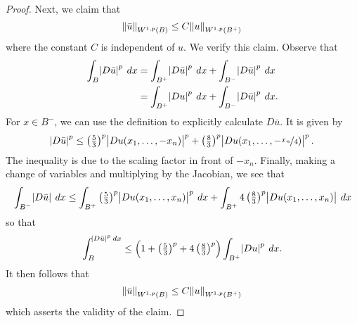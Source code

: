 \documentclass[10pt]{article}
\begin{document}
\begin{proof}
 	Next, we claim that 
 	\begin{equation*}
 		\displaystyle \norm{\bar{u}}_{W^{1,p}(B)} \leq C \norm{u}_{W^{1,p}(B^+)}
 	\end{equation*}
 	where the constant $C$ is independent of $u$. We verify this claim. Observe that
 	\begin{align*}
	 	\displaystyle \int_{B}{\abs{D\bar{u}}^p \: dx} &= \int_{B^+}{\abs{D\bar{u}}^p \: dx} + \int_{B^-}{\abs{D\bar{u}}^p \: dx} \\
	 	&= \int_{B^+}{\abs{Du}^p \: dx} + \int_{B^-}{\abs{D\bar{u}}^p \: dx}.
 	\end{align*}
 	For $x \in B^-$, we can use the definition to explicitly calculate $D\bar{u}$. It is given by 
 	\begin{equation*}
 		\displaystyle \abs{D\bar{u}}^p \leq \left(\tfrac{5}{3}\right)^{p}\abs{Du(x_1,\dots,-x_n)}^p + \left(\tfrac{8}{3}\right)^p\abs{Du(x_1,\dots,-\nicefrac{x_n}{4})}^p.
 	\end{equation*}
 	The inequality is due to the scaling factor in front of $-x_n$. Finally, making a change of variables and multiplying by the Jacobian, we see that 
 	\begin{equation*}
 		\displaystyle \int_{B^-}{\abs{D\bar{u}} \: dx} \leq \int_{B^+}{\left(\tfrac{5}{3}\right)^{p}\abs{Du(x_1,\dots,x_n)}^p \: dx} + \int_{B^+}{4\left(\tfrac{8}{3}\right)^p\abs{Du(x_1,\dots,x_n)} \: dx} 
 	\end{equation*}
 	so that 
 	\begin{equation*}
 		\displaystyle \int_{B}^{\abs{D\bar{u}}^p \: dx} \leq \left( 1 + \left(\tfrac{5}{3}\right)^p + 4\left(\tfrac{8}{3}\right)^p \right)\int_{B^+}{\abs{Du}^p \: dx}.
 	\end{equation*}
 	It then follows that 
 	\begin{equation*}
 		\displaystyle \norm{\bar{u}}_{W^{1,p}(B)} \leq C\norm{u}_{W^{1,p}(B^+)}
 	\end{equation*}
 	which asserts the validity of the claim. 
 	

\end{proof}
\end{document}
